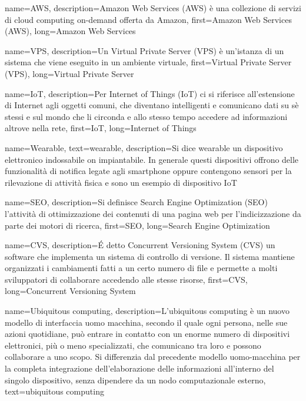 {
    name={AWS},
    description={Amazon Web Services (AWS) è una collezione di servizi di cloud computing on-demand offerta da Amazon},
    first={Amazon Web Services (AWS)},
    long={Amazon Web Services}
}

{
    name={VPS},
    description={Un Virtual Private Server (VPS) è un'istanza di un sistema che viene eseguito in un ambiente virtuale},
    first={Virtual Private Server (VPS)},
    long={Virtual Private Server}
}

{
    name={IoT},
    description={Per Internet of Things (IoT) ci si riferisce all'estensione di Internet agli oggetti comuni, che diventano intelligenti e comunicano dati su sè stessi e sul mondo che li circonda e allo stesso tempo accedere ad informazioni altrove nella rete},
    first={IoT},
    long={Internet of Things}
}

{
    name={Wearable},
    text={wearable},
    description={Si dice wearable un dispositivo elettronico indossabile on impiantabile. In generale questi dispositivi offrono delle funzionalità di notifica legate agli smartphone oppure contengono sensori per la rilevazione di attività fisica e sono un esempio di dispositivo \gls{IoT}}
}

{
    name={SEO},
    description={Si definisce Search Engine Optimization (SEO) l'attività di ottimizzazione dei contenuti di una pagina web per l'indicizzazione da parte dei motori di ricerca},
    first={SEO},
    long={Search Engine Optimization}
}

{
    name={CVS},
    description={É detto Concurrent Versioning System (CVS) un software che implementa un sistema di controllo di versione. Il sistema mantiene organizzati i cambiamenti fatti a un certo numero di file e permette a molti sviluppatori di collaborare accedendo alle stesse risorse},
    first={CVS},
    long={Concurrent Versioning System}
}

{
    name={Ubiquitous computing},
    description={L'ubiquitous computing è un nuovo modello di interfaccia uomo macchina, secondo il quale ogni persona, nelle sue azioni quotidiane, può entrare in contatto con un enorme numero di dispositivi elettronici, più o meno specializzati, che comunicano tra loro e possono collaborare a uno scopo. Si differenzia dal precedente modello uomo-macchina per la completa integrazione dell'elaborazione delle informazioni all'interno del singolo dispositivo, senza dipendere da un nodo computazionale esterno},
    text={ubiquitous computing}
}

